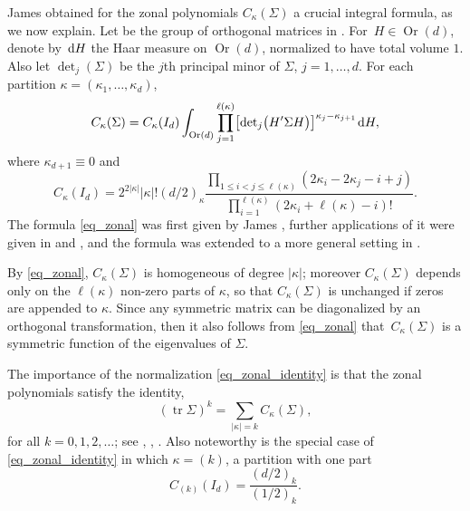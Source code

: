 \documentclass[pdftex]{sigma}
\numberwithin{equation}{section}
\def\R {\mathbb{R}}
\def\dd {\hskip1pt\mathrm{d}}
\def\tr {\mathop{\mathrm{tr}}}
\def\Or{\mathop{\mathrm{Or}}}
\begin{document}
James \cite{James73} obtained for the zonal polynomials $C_\kappa(\Sigma)$ a crucial integral formula, as we now explain. Let \smash{$\Or(d) = \bigl\{H \in \R^{d \times d}\mid H'H = I_d\bigr\}$} be the group of orthogonal matrices in \smash{$\R^{d \times d}$}. For~${H \in \Or(d)}$, denote by $\dd H$ the Haar measure on $\Or(d)$, normalized to have total volume $1$. Also let ${\det}_j(\Sigma)$ be the $j$th principal minor of $\Sigma$, $j=1,\ldots,d$. For each partition $\kappa = (\kappa_1,\ldots,\kappa_d)$,
\begin{gather}
\label{eq_zonal}
C_\kappa(\Sigma) = C_\kappa(I_d) \int_{\Or(d)} \prod_{j=1}^{\ell(\kappa)} \bigl[{\det}_j\bigl(H' \Sigma H\bigr)\bigr]^{\kappa_j-\kappa_{j+1}} \dd H,
\end{gather}
where $\kappa_{d+1} \equiv 0$ and
\begin{equation}
\label{eq_zonal_identity}
C_\kappa(I_d) = 2^{2 |\kappa|} |\kappa|! (d/2)_\kappa \frac{\prod\limits_{1 \le i < j \le \ell(\kappa)} (2\kappa_i - 2\kappa_j - i + j)}{\prod\limits_{i=1}^{\ell(\kappa)} (2\kappa_i + \ell(\kappa) - i)!}.
\end{equation}
The formula \eqref{eq_zonal} was first given by James \cite[equation~(10.4)]{James73}, further applications of it were given in \cite{Kushner} and \cite{Richards85}, and the formula was extended to a more general setting in \cite[Theorem~4.8]{GrossRichards}.

By \eqref{eq_zonal}, $C_\kappa(\Sigma)$ is homogeneous of degree $|\kappa|$; moreover $C_\kappa(\Sigma)$ depends only on the $\ell(\kappa)$ non-zero parts of $\kappa$, so that $C_\kappa(\Sigma)$ is unchanged if zeros are appended to $\kappa$. Since any symmetric matrix can be diagonalized by an orthogonal transformation, then it also follows from \eqref{eq_zonal} that~$C_\kappa(\Sigma)$ is a symmetric function of the eigenvalues of $\Sigma$.

The importance of the normalization \eqref{eq_zonal_identity} is that the zonal polynomials satisfy the identity,
\begin{equation}
\label{eq_trace_zonal}
(\tr \Sigma)^k = \sum_{|\kappa|=k} C_\kappa(\Sigma),
\end{equation}
for all $k=0,1,2,\ldots$; see \cite[p.~479, equation~(21)]{James64}, \cite[p.~228, equation~(iii)]{Muirhead}, \cite[equation~(35.4.6)]{Richards10}. Also noteworthy is the special case of \eqref{eq_zonal_identity} in which $\kappa = (k)$, a partition with one part
\begin{equation}
\label{eq_zonal_identity_1part}
C_{(k)}(I_d) = \frac{(d/2)_k}{(1/2)_k}.
\end{equation}
\end{document}
